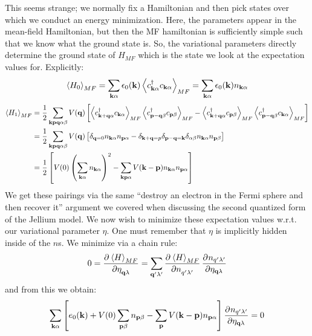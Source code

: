 This seems strange; we normally fix a Hamiltonian and then pick states over which we conduct an energy minimization. Here, the parameters appear in the mean-field Hamiltonian, but then the MF hamiltonian is sufficiently simple such that we know what the ground state is. So, the variational parameters directly determine the ground state of $H_{MF}$ which is the state we look at the expectation values for. Explicitly:
\begin{equation}
    \left< H_0 \right>_{MF} = \sum_{\mathbf{k}\alpha}\epsilon_0(\mathbf{k})\left< c^\dagger_{\mathbf{k}\alpha}c_{\mathbf{k}\alpha} \right>_{MF} = \sum_{\mathbf{k}\alpha}\epsilon_0(\mathbf{k})n_{\mathbf{k}\alpha}
\end{equation}
\begin{equation}
    \begin{split}
        \left< H_1 \right>_{MF} &= \frac{1}{2}\sum_{\mathbf{kpq}\alpha\beta}V(\mathbf{q})\left[\left< c^\dagger_{\mathbf{k} + \mathbf{q}\alpha}c_{\mathbf{k}\alpha} \right>_{MF}\left< c^\dagger_{\mathbf{p} - \mathbf{q}\beta}c_{\mathbf{p}\beta} \right>_{MF} - \left< c^\dagger_{\mathbf{k} + \mathbf{q}\alpha}c_{\mathbf{p}\beta} \right>_{MF}\left< c^\dagger_{\mathbf{p} - \mathbf{q}\beta}c_{\mathbf{k}\alpha} \right>_{MF}\right]
        \\ &= \frac{1}{2}\sum_{\mathbf{kpq}\alpha\beta}V(\mathbf{q})\left[\delta_{\mathbf{q} = 0}n_{\mathbf{k}\alpha}n_{\mathbf{p}\alpha} - \delta_{\mathbf{k} + \mathbf{q} = p}\delta_{\mathbf{p} - \mathbf{q} = \mathbf{k}}\delta_{\alpha\beta}n_{\mathbf{k}\alpha}n_{\mathbf{p}\beta}\right]
        \\ &= \frac{1}{2}\left[V(0)\left(\sum_{\mathbf{k}\alpha} n_{\mathbf{k}\alpha}\right)^2 - \sum_{\mathbf{k}\mathbf{p}\alpha}V(\mathbf{k} - \mathbf{p})n_{\mathbf{k}\alpha}n_{\mathbf{p}\alpha}\right]
    \end{split}
\end{equation}
We get these pairings via the same ``destroy an electron in the Fermi sphere and then recover it'' argument we covered when discussing the second quantized form of the Jellium model. We now wish to minimize these expectation values w.r.t. our variational parameter $\eta$. One must remember that $\eta$ is implicitly hidden inside of the $n$s. We minimize via a chain rule:
\begin{equation}
        0 = \dpd{\avg{H}_{MF}}{\eta_{\v{q}\lambda}} = \sum_{\v{q}'\lambda'} \dpd{\avg{H}_{MF}}{n_{q'\lambda'}}\dpd{n_{q'\lambda'}}{{\eta_{\v{q}\lambda}}}
\end{equation}
and from this we obtain:
\begin{equation}\label{eq-lec512}
    \sum_{\v{k}\alpha}\left[e_0(\v{k}) + V(0)\sum_{\v{p}\beta}n_{\v{p}\beta} - \sum_{\v{p}}V(\v{k} - \v{p})n_{\v{p}\alpha}\right]\dpd{n_{q'\lambda'}}{{\eta_{\v{q}\lambda}}} = 0
\end{equation}
